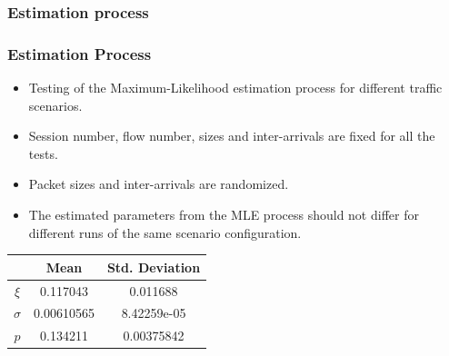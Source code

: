 \documentclass[9pt,handout,serif]{beamer}
\begin{document}
\subsubsection*{Estimation process}
\begin{frame}[c]
	\frametitle{Estimation Process}
	\begin{itemize}
		\item Testing of the Maximum-Likelihood estimation process for different traffic scenarios.
		\item Session number, flow number, sizes and inter-arrivals are fixed for all the tests.
		\item Packet sizes and inter-arrivals are randomized.
		\item The estimated parameters from the MLE process should not differ for different runs of the same scenario configuration.		
	\end{itemize}
	
	\begin{table}
	\centering
	\begin{tabular}{ c | c | c }
		& Mean & Std. Deviation \\ \hline
		$\xi$ & 0.117043 & 0.011688 \\ 
		$\sigma$ & 0.00610565 & 8.42259e-05 \\
		$p$ & 0.134211 & 0.00375842 \\
	\end{tabular}
	\end{table}
\end{frame}
\end{document}
